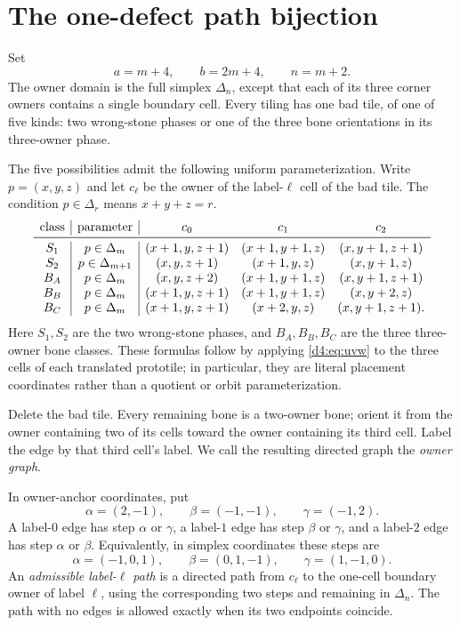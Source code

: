 \section{The one-defect path bijection}

Set
\[
 a=m+4,\qquad b=2m+4,\qquad n=m+2.
\]
The owner domain is the full simplex $\Delta_n$, except that each of its three
corner owners contains a single boundary cell.  Every tiling has one bad
tile, of one of five kinds: two wrong-stone phases or one of the three bone
orientations in its three-owner phase.

The five possibilities admit the following uniform parameterization.  Write
$p=(x,y,z)$ and let $c_\ell$ be the owner of the label-$\ell$ cell of the bad
tile.  The condition $p\in\Delta_r$ means $x+y+z=r$.
\begin{equation}\label{d4:eq:defect-cores}
\begin{array}{c|c|ccc}
\text{class}&\text{parameter}&c_0&c_1&c_2\\ \midrule
S_1&p\in\Delta_m
 &(x+1,y,z+1)&(x+1,y+1,z)&(x,y+1,z+1)\\
S_2&p\in\Delta_{m+1}
 &(x,y,z+1)&(x+1,y,z)&(x,y+1,z)\\
B_A&p\in\Delta_m
 &(x,y,z+2)&(x+1,y+1,z)&(x,y+1,z+1)\\
B_B&p\in\Delta_m
 &(x+1,y,z+1)&(x+1,y+1,z)&(x,y+2,z)\\
B_C&p\in\Delta_m
 &(x+1,y,z+1)&(x+2,y,z)&(x,y+1,z+1).
\end{array}
\end{equation}
Here $S_1,S_2$ are the two wrong-stone phases, and $B_A,B_B,B_C$
are the three three-owner bone classes.  These formulas follow by applying
\eqref{d4:eq:uvw} to the three cells of each translated prototile; in
particular, they are literal placement coordinates rather than a quotient or
orbit parameterization.

Delete the bad tile.  Every remaining bone is a two-owner bone; orient it
from the owner containing two of its cells toward the owner containing its
third cell.  Label the edge by that third cell's label.  We call the resulting
directed graph the \emph{owner graph}.

In owner-anchor coordinates, put
\[
 \alpha=(2,-1),\qquad \beta=(-1,-1),\qquad \gamma=(-1,2).
\]
A label-$0$ edge has step $\alpha$ or $\gamma$, a label-$1$ edge has step
$\beta$ or $\gamma$, and a label-$2$ edge has step $\alpha$ or $\beta$.
Equivalently, in simplex coordinates these steps are
\[
 \alpha=(-1,0,1),\qquad
 \beta=(0,1,-1),\qquad
 \gamma=(1,-1,0).
\]
An \emph{admissible label-$\ell$ path} is a directed path from $c_\ell$ to
the one-cell boundary owner of label $\ell$, using the corresponding two
steps and remaining in $\Delta_n$.  The path with no edges is allowed exactly
when its two endpoints coincide.


